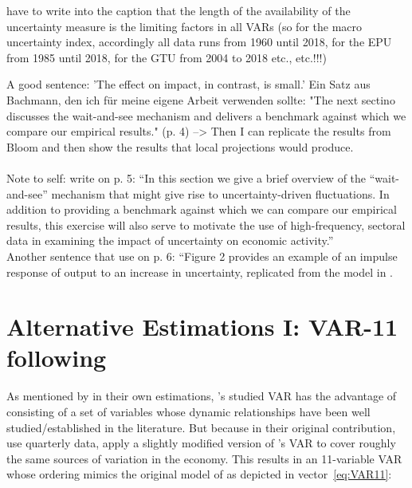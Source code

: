 \documentclass[a4paper,12pt,oneside,pointednumbers,bibtotoc,bigheadings,liststotoc]{scrbook}
\begin{document}
have to write into the caption that the length of the availability of the uncertainty measure is the limiting factors in all VARs (so for the macro uncertainty index, accordingly all data runs from 1960 until 2018, for the EPU from 1985 until 2018, for the GTU from 2004 to 2018 etc., etc.!!!)



A good sentence: 'The effect on impact, in contrast, is small.' 
Ein Satz aus Bachmann, den ich für meine eigene Arbeit verwenden sollte: "The next sectino discusses the wait-and-see mechanism and delivers a benchmark against which we compare our empirical results." (p. 4) --> Then I can replicate the results from Bloom and then show the results that local projections would produce.\\
\\
Note to self: \citet{bachmannetal:13} write on p. 5: ``In this section we give a brief overview of the ``wait-and-see'' mechanism that might give rise to uncertainty-driven fluctuations. In addition to providing a benchmark against which we can compare our empirical results, this exercise will also serve to motivate the use of high-frequency, sectoral data in examining the impact of uncertainty on economic activity.''\\
Another sentence that \citet{bachmannetal:13} use on p. 6: ``Figure 2 provides an example of an impulse response of output to an increase in uncertainty, replicated from the model in \citet{bloom:09}.


\section{Alternative Estimations I: VAR-11 following \citet{christianoetal:05}}
\label{sec:VAR11}
As mentioned by \citet{juradoetal:15} in their own estimations, \citet{christianoetal:05}'s studied VAR has the advantage of consisting of a set of variables whose dynamic relationships have been well studied/established in the literature. But because in their original contribution, \citet{christianoetal:05} use quarterly data, \citet{juradoetal:15} apply a slightly modified version of \citet{christianoetal:05}'s VAR to cover roughly the same sources of variation in the economy. This results in an 11-variable VAR whose ordering mimics the original model of \citet{christianoetal:05} as depicted in vector~\ref{eq:VAR11}:
\end{document}
